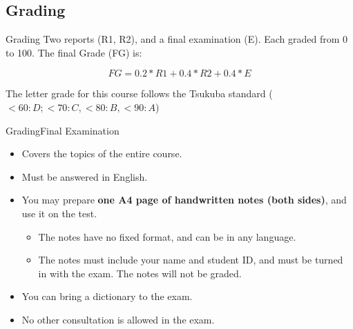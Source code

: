 \documentclass[aspectratio=169]{beamer}
\begin{document}


\subsection{Grading}
\begin{frame}{Grading}
  Two reports (R1, R2), and a final examination (E). Each graded from 0 to 100.
  The final Grade (FG) is:

  \begin{equation*}
    FG = 0.2*R1 + 0.4*R2 + 0.4*E
  \end{equation*}
  \bigskip

  The letter grade for this course follows the Tsukuba standard ($< 60: D; < 70: C, < 80: B, < 90: A$)
\end{frame}

\begin{frame}{Grading}{Final Examination}
  \begin{itemize}
    \item Covers the topics of the entire course.
    \item Must be answered in English.
    \item You may prepare {\bf one A4 page of handwritten notes (both sides)}, and use it on the test.
    \begin{itemize}
      \item The notes have no fixed format, and can be in any language.
      \item The notes must include your name and student ID, and must be turned in with the exam. The notes will not be graded.
    \end{itemize}
    \item You can bring a dictionary to the exam.
    \item No other consultation is allowed in the exam.
  \end{itemize}
\end{frame}
\end{document}
